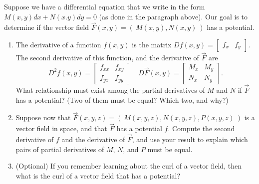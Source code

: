 \begin{problem}\label{test for a potential}
 Suppose we have a differential equation that we write in the form $M(x,y)dx+N(x.y)dy=0$ (as done in the paragraph above). Our goal is to determine if the vector field $\vec F(x,y) = \left(\  M(x,y),N(x,y)\ \right)$ has a potential.
\begin{enumerate}
 \item The derivative of a function $f(x,y)$ is the matrix $Df(x,y) = \begin{bmatrix}f_x&f_y\end{bmatrix}$. The second derivative of this function, and the derivative of $\vec F$ are
$$
D^2f(x,y) = 
\begin{bmatrix}f_{xx}&f_{xy}\\f_{yx}&f_{yy}\end{bmatrix}
\quad 
D\vec F(x,y)=
\begin{bmatrix}M_x&M_y\\N_x&N_y\end{bmatrix}
.$$
What relationship must exist among the partial derivatives of $M$ and $N$ if $\vec F$ has a potential? (Two of them must be equal?  Which two, and why?)
 \item Suppose now that $\vec F(x,y,z) = \left(\  M(x,y,z),N(x,y,z),P(x,y,z)\ \right)$ is a vector field in space, and that $\vec F$ has a potential $f$.  Compute the second derivative of $f$ and the derivative of $\vec F$, and use your result to explain which pairs of partial derivatives of $M$, $N$, and $P$ must be equal.
 \item (Optional) If you remember learning about the curl of a vector field, then what is the curl of a vector field that has a potential?
\end{enumerate}
\end{problem}









